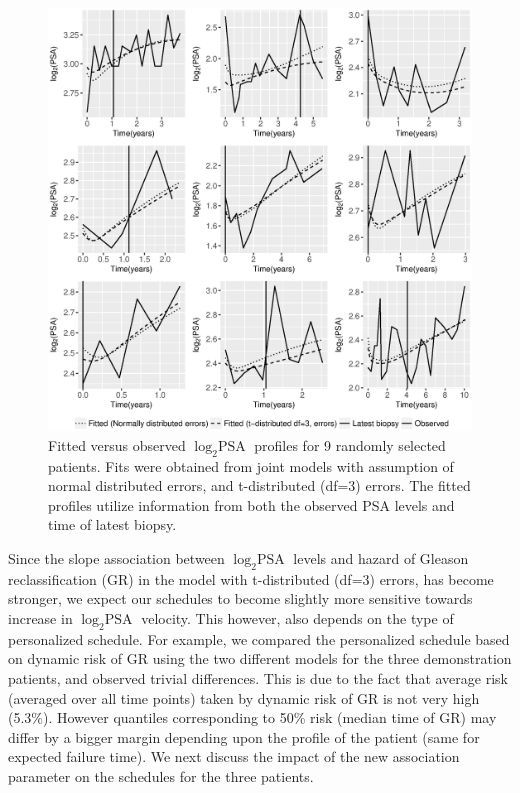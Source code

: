 \begin{enumerate}
    \begin{figure}[!htb]
	\centerline{\includegraphics[width=\columnwidth]{images/model_fit/subject_fittedVsObserved_psa_norm_t3.eps}}
	\caption{Fitted versus observed $\log_2 \mbox{PSA}$ profiles for 9 randomly selected patients. Fits were obtained from joint models with assumption of normal distributed errors, and t-distributed (df=3) errors. The fitted profiles utilize information from both the observed PSA levels and time of latest biopsy.}
	\label{fig : subject_fittedVsObserved_psa_norm_t3}
	\end{figure}

	Since the slope association between $\log_2 \mbox{PSA}$ levels and hazard of Gleason reclassification (GR) in the model with t-distributed (df=3) errors, has become stronger, we expect our schedules to become slightly more sensitive towards increase in $\log_2 \mbox{PSA}$ velocity. This however, also depends on the type of personalized schedule. For example, we compared the personalized schedule based on dynamic risk of GR using the two different models for the three demonstration patients, and observed trivial differences. This is due to the fact that average risk (averaged over all time points) taken by dynamic risk of GR is not very high (5.3\%). However quantiles corresponding to 50\% risk (median time of GR) may differ by a bigger margin depending upon the profile of the patient (same for expected failure time). We next discuss the impact of the new association parameter on the schedules for the three patients.


\end{enumerate}
